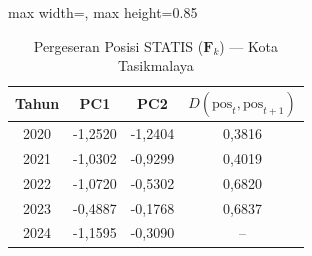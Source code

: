 \begin{table}[H]
\centering
\caption{Pergeseran Posisi STATIS ($\mathbf{F}_k$) --- Kota Tasikmalaya} \label{tab:app1jarak_statis_skor_kota_tasikmalaya}
\begin{adjustbox}{max width=\textwidth, max height=0.85\textheight}
\begin{tabular}{|c|c|c|c|}
\hline
\textbf{Tahun} & \textbf{PC1} & \textbf{PC2} & \textbf{$D(\text{pos}_t, \text{pos}_{t+1})$} \\
\hline
2020 & -1,2520 & -1,2404 & 0,3816 \\
2021 & -1,0302 & -0,9299 & 0,4019 \\
2022 & -1,0720 & -0,5302 & 0,6820 \\
2023 & -0,4887 & -0,1768 & 0,6837 \\
2024 & -1,1595 & -0,3090 & -- \\
\hline
\end{tabular}
\end{adjustbox}
\end{table}